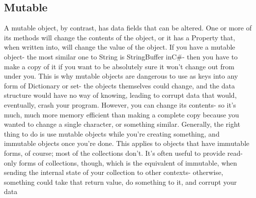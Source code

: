\documentclass{sig-alternate}
\begin{document}
\subsection{Mutable}
A mutable object, by contrast, has data fields that can be altered. One or more of its methods will change the contents of the object, or it has a Property that, when written into, will change the value of the object.
If you have a mutable object- the most similar one to String is StringBuffer inC\#- then you have to make a copy of it if you want to be absolutely sure it won't change out from under you. This is why mutable objects are dangerous to use as keys into any form of Dictionary or set- the objects themselves could change, and the data structure would have no way of knowing, leading to corrupt data that would, eventually, crash your program.
However, you can change its contents- so it's much, much more memory efficient than making a complete copy because you wanted to change a single character, or something similar.
Generally, the right thing to do is use mutable objects while you're creating something, and immutable objects once you're done. This applies to objects that have immutable forms, of course; most of the collections don't. It's often useful to provide read-only forms of collections, though, which is the equivalent of immutable, when sending the internal state of your collection to other contexts- otherwise, something could take that return value, do something to it, and corrupt your data
\end{document}
